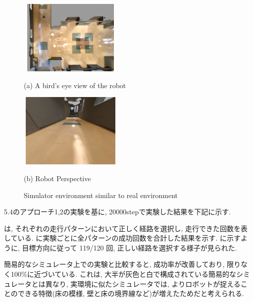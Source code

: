\begin{figure}[h]
  \centering
  \begin{minipage}[b]{67mm}
    \centering
    \includegraphics[width=50mm, height=36mm]{images/real_sim_up.png}
    \caption*{(a) A bird's eye view of the robot}
  \end{minipage} 
  \begin{minipage}[b]{67mm}
    \centering
    \includegraphics[width=50mm, height=36mm]{images/real_sim_robot.png}
    \caption*{(b) Robot Perspective}
  \end{minipage}
  \caption{Simulator environment similar to real environment}
  \label{Fig:real_sim}
\end{figure}

5.4のアプローチ1,2の実験を基に, 20000stepで実験した結果を下記に示す.

 は, それぞれの走行パターンにおいて正しく経路を選択し, 走行できた回数を表している.  に実験ごとに全パターンの成功回数を合計した結果を示す.  に示すように, 目標方向に従って 119/120 回, 正しい経路を選択する様子が見られた.

簡易的なシミュレータ上での実験と比較すると, 成功率が改善しており, 限りなく100\%に近づいている. これは, 大半が灰色と白で構成されている簡易的なシミュレータとは異なり, 実環境に似たシミュレータでは, よりロボットが捉えることのできる特徴(床の模様, 壁と床の境界線など)が増えたためだと考えられる.

